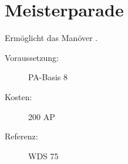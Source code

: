 \section{Meisterparade}
\label{sf.meisterparade}
Ermöglicht das Manöver .
\begin{description}
    \item[Voraussetzung:]
        PA-Basis 8
    \item [Kosten:]
        200 AP
    \item [Referenz:]
        WDS 75
\end{description}
